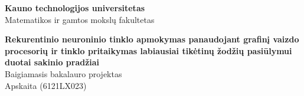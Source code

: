 

\begin{titlepage}
  \begin{center}


    \begin{figure}[H]
      \centering
    \end{figure}

    \vspace*{30pt}

    \fontXII
    \textbf{Kauno technologijos universitetas}\\
    Matematikos ir gamtos mokslų fakultetas

    \vspace*{100pt}

    \fontXVIII
	   \textbf{Rekurentinio neuroninio tinklo apmokymas panaudojant grafinį vaizdo procesorių ir tinklo pritaikymas labiausiai tikėtinų žodžių pasiūlymui duotai sakinio pradžiai}\\
     \fontXIV
     Baigiamasis bakalauro projektas\\
     Apskaita (6121LX023)

     \vspace*{40pt}

     \fontXII




\end{center}
\end{titlepage}
